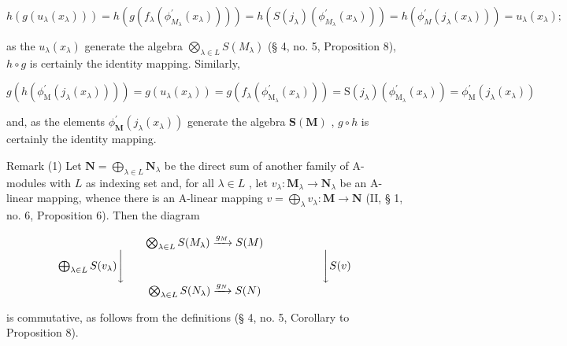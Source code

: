 \[
h \left(g \left(u _ {\lambda} \left(x _ {\lambda}\right)\right)\right) = h \left(g \left(f _ {\lambda} \left(\phi_ {M _ {\lambda}} ^ {\prime} \left(x _ {\lambda}\right)\right)\right)\right) = h \left(S \left(j _ {\lambda}\right) \left(\phi_ {M _ {\lambda}} ^ {\prime} \left(x _ {\lambda}\right)\right)\right) = h \left(\phi_ {M} ^ {\prime} \left(j _ {\lambda} \left(x _ {\lambda}\right)\right)\right) = u _ {\lambda} \left(x _ {\lambda}\right);
\]

as the \(u_{\lambda}(x_{\lambda})\) generate the algebra \(\bigotimes_{\lambda \in L} S(M_{\lambda})\) (§ 4, no. 5, Proposition 8), \(h \circ g\) is certainly the identity mapping. Similarly,

\[
g \left(h \left(\phi_ {\mathrm{M}} ^ {\prime} \left(j _ {\lambda} \left(x _ {\lambda}\right)\right)\right)\right) = g \left(u _ {\lambda} \left(x _ {\lambda}\right)\right) = g \left(f _ {\lambda} \left(\phi_ {\mathrm{M} _ {\lambda}} ^ {\prime} \left(x _ {\lambda}\right)\right)\right) = \mathrm{S} \left(j _ {\lambda}\right) \left(\phi_ {\mathrm{M} _ {\lambda}} ^ {\prime} \left(x _ {\lambda}\right)\right) = \phi_ {\mathrm{M}} ^ {\prime} \left(j _ {\lambda} \left(x _ {\lambda}\right)\right)
\]

and, as the elements \(\phi_{\mathbf{M}}^{\prime}(j_{\lambda}(x_{\lambda}))\) generate the algebra \(\mathbf{S}(\mathbf{M})\) , \(g \circ h\) is certainly the identity mapping.

Remark (1) Let \(\mathbf{N} = \bigoplus_{\lambda \in L} \mathbf{N}_{\lambda}\) be the direct sum of another family of A-modules with \(L\) as indexing set and, for all \(\lambda \in L\) , let \(v_{\lambda}: \mathbf{M}_{\lambda} \to \mathbf{N}_{\lambda}\) be an A-linear mapping, whence there is an A-linear mapping \(v = \bigoplus_{\lambda} v_{\lambda}: \mathbf{M} \to \mathbf{N}\) (II, § 1, no. 6, Proposition 6). Then the diagram

\[
\begin{array}{c} \bigotimes_ {\lambda \in L} S (M _ {\lambda}) \xrightarrow {g _ {M}} S (M) \\ \bigoplus_ {\lambda \in L} S (v _ {\lambda}) \Biggl \downarrow \qquad \qquad \qquad \qquad \qquad \qquad \qquad \qquad \qquad \Biggl \downarrow S (v) \\ \bigotimes_ {\lambda \in L} S (N _ {\lambda}) \xrightarrow {g _ {N}} S (N) \end{array}
\]

is commutative, as follows from the definitions (§ 4, no. 5, Corollary to Proposition 8).

